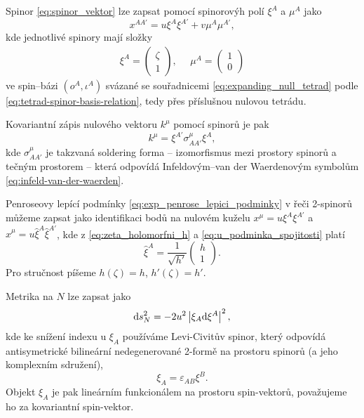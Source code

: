 Spinor \eqref{eq:spinor_vektor} lze zapsat pomocí spinorovýh polí $\xi^A$ a $\mu^A$ jako
\begin{equation}
    \label{eq:spinor_position}
    x^{AA'} = u \xi^A \xi^{A'} + v \mu^A \mu^{A'},
\end{equation}
kde jednotlivé spinory mají složky
\begin{align}
    \label{eq:xi_mu_explicitne_v_bazi}
    \xi^A = \begin{pmatrix}
        \zeta \\ 1
    \end{pmatrix}, ~~~~~~ \mu^A = \begin{pmatrix}
        1 \\ 0
    \end{pmatrix}
\end{align}
ve spin--bázi $(o^A, \iota^A)$ svázané se souřadnicemi \eqref{eq:expanding_null_tetrad} podle \eqref{eq:tetrad-spinor-basis-relation}, tedy
přes příslušnou nulovou tetrádu.

Kovariantní zápis nulového vektoru $k^\mu$ pomocí spinorů je pak
\begin{equation}
    k^\mu = \xi^{A'} \sigma^\mu_{AA'} \xi^{A},
\end{equation}
kde $\sigma^\mu_{AA'}$ je takzvaná soldering forma -- izomorfismus mezi prostory spinorů a tečným prostorem -- která
odpovídá Infeldovým--van der Waerdenovým symbolům \eqref{eq:infeld-van-der-waerden}.

Penroseovy lepící podmínky \eqref{eq:exp_penrose_lepici_podminky} v řeči 2-spinorů můžeme zapsat jako
identifikaci bodů na nulovém kuželu $x^\mu = u \xi^A \xi^{A'}$ a $\hat{x}^\mu = u \hat{\xi}^A \hat{\xi}^{A'}$,
kde z \eqref{eq:zeta_holomorfni_h} a \eqref{eq:u_podminka_spojitosti} platí
\begin{equation}
    \label{eq:xi_transformace}
    \hat{\xi}^A = \frac{1}{\sqrt{h'}} \begin{pmatrix}
        h \\ 1
    \end{pmatrix}.
\end{equation}
Pro stručnost píšeme $h(\zeta) = h$, $h'(\zeta) = h'$.

Metrika na $N$ lze zapsat jako
\begin{equation}
    \mathrm{d} s_N^2 = - 2 u^2 \left| \xi_A \mathrm{d} \xi^A \right|^2,
\end{equation}
kde ke snížení indexu u $\xi_A$ používáme Levi-Civitův spinor, který odpovídá
antisymetrické bilineární nedegenerované 2-formě na prostoru spinorů (a jeho komplexním sdružení),
\begin{equation}
    \xi_A = \varepsilon_{AB} \xi^B.
\end{equation}
Objekt $\xi_A$ je pak lineárním funkcionálem na prostoru spin-vektorů, považujeme ho za kovariantní spin-vektor.

